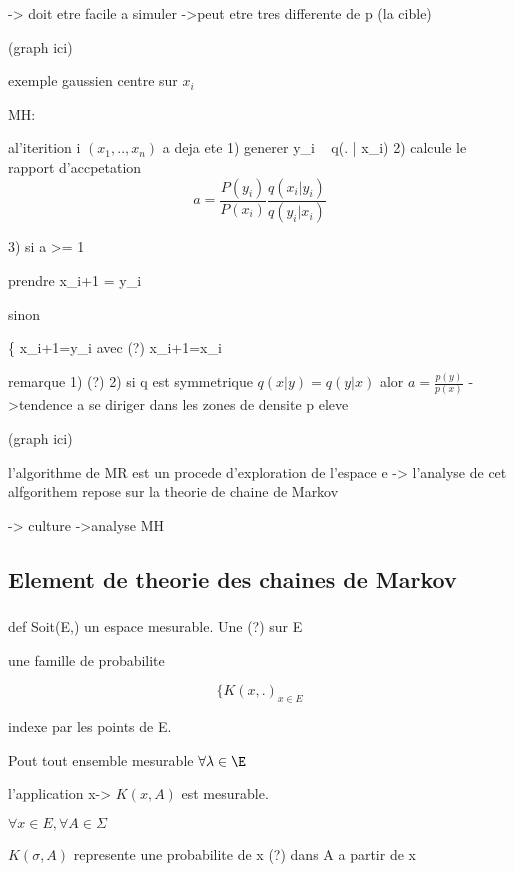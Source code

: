 \documentclass{article}
\begin{document}
-> doit etre facile a simuler
->peut etre tres differente de p (la cible)

(graph ici)

exemple gaussien centre sur $x_i$

MH:

al'iterition i $(x_1, .. ,x_n)$ a deja ete 
1) generer y_i ~ q(. | x_i)
2) calcule le rapport d'accpetation 
\begin{equation}

a=\frac{P(y_i)}{P(x_i)}\frac{q(x_i|y_i)}{q(y_i|x_i)}

\end{equation}

3) si a >= 1

prendre x_{i+1} = y_i

sinon

\{
x_i+1=y_i avec (?)
x_i+1=x_i


remarque
1) (?)
2) si q est symmetrique
$q(x|y) = q(y|x)$
alor $a=\frac{p(y)}{p(x)}$
->tendence a se diriger dans les zones de densite p eleve

(graph ici)

l'algorithme de MR est un procede d'exploration de l'espace e
-> l'analyse de cet alfgorithem repose sur la theorie de chaine de Markov

-> culture
->analyse MH


\subsection{Element de theorie des chaines de Markov}
\subsubsection{}

def Soit(E,\eplsion) un espace mesurable. Une (?) sur E

une famille de probabilite

\begin{equation}

\{K(x,.)_{x\in E}
\end{equation}

indexe par les points de E.

Pout tout ensemble mesurable $\forall \lambda \in \E$

l'application x-> $K(x,A)$ est mesurable.

$\forall x \in E, \forall A\in \Sigma$

$K(\sigma, A)$ represente une probabilite de x (?) dans A a partir de x
\end{document}
